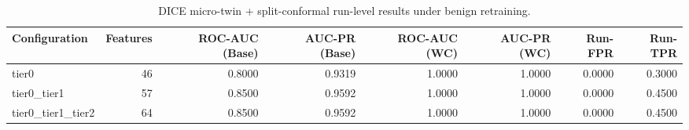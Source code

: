\begin{table}[t]
\centering
\caption{DICE micro-twin + split-conformal run-level results under benign retraining.}
\label{tab:dice_full_overall}
\footnotesize
\begin{tabular}{lrrrrrrr}
\toprule
Configuration & Features & ROC-AUC (Base) & AUC-PR (Base) & ROC-AUC (WC) & AUC-PR (WC) & Run-FPR & Run-TPR \\
\midrule
tier0 & 46 & 0.8000 & 0.9319 & 1.0000 & 1.0000 & 0.0000 & 0.3000 \\
tier0_tier1 & 57 & 0.8500 & 0.9592 & 1.0000 & 1.0000 & 0.0000 & 0.4500 \\
tier0_tier1_tier2 & 64 & 0.8500 & 0.9592 & 1.0000 & 1.0000 & 0.0000 & 0.4500 \\
\bottomrule
\end{tabular}

\end{table}
